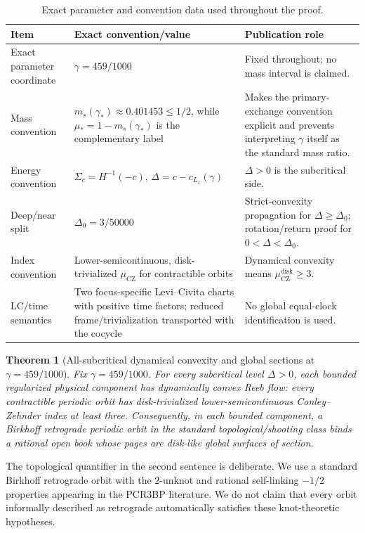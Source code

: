\documentclass[11pt]{article}
\newtheorem{theorem}{Theorem}[section]
\begin{document}
\begin{table}[ht]
\centering
\small
\caption{Exact parameter and convention data used throughout the proof.}
\label{tab:parameter-conventions}
\begin{tabularx}{\textwidth}{@{}>{\raggedright\arraybackslash}p{} X >{\raggedright\arraybackslash}p{}@{}}
\toprule
Item & Exact convention/value & Publication role \\
\midrule
Exact parameter coordinate & $\gamma=459/1000$ & Fixed throughout; no mass interval is claimed. \\
Mass convention & $m_s(\gamma_*)\approx0.401453\le1/2$, while $\mu_*=1-m_s(\gamma_*)$ is the complementary label & Makes the primary-exchange convention explicit and prevents interpreting $\gamma$ itself as the standard mass ratio. \\
Energy convention & $\Sigma_c=H^{-1}(-c)$, $\Delta=c-c_{L_1}(\gamma)$ & $\Delta>0$ is the subcritical side. \\
Deep/near split & $\Delta_0=3/50000$ & Strict-convexity propagation for $\Delta\ge\Delta_0$; rotation/return proof for $0<\Delta<\Delta_0$. \\
Index convention & Lower-semicontinuous, disk-trivialized $\mu_{\mathrm{CZ}}$ for contractible orbits & Dynamical convexity means $\mu_{\mathrm{CZ}}^{\mathrm{disk}}\ge3$. \\
LC/time semantics & Two focus-specific Levi--Civita charts with positive time factors; reduced frame/trivialization transported with the cocycle & No global equal-clock identification is used. \\
\bottomrule
\end{tabularx}
\end{table}

\begin{theorem}[All-subcritical dynamical convexity and global sections at $\gamma=459/1000$]\label{thm:main}
Fix $\gamma=459/1000$. For every subcritical level $\Delta>0$, each bounded regularized physical component has dynamically convex Reeb flow: every contractible periodic orbit has disk-trivialized lower-semicontinuous Conley--Zehnder index at least three. Consequently, in each bounded component, a Birkhoff retrograde periodic orbit in the standard topological/shooting class binds a rational open book whose pages are disk-like global surfaces of section.
\end{theorem}

The topological quantifier in the second sentence is deliberate. We use a standard Birkhoff retrograde orbit with the $2$-unknot and rational self-linking $-1/2$ properties appearing in the PCR3BP literature. We do not claim that every orbit informally described as retrograde automatically satisfies these knot-theoretic hypotheses.
\end{document}
